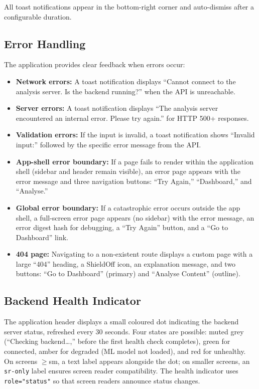 All toast notifications appear in the bottom-right corner and auto-dismiss after a configurable duration.

\subsection{Error Handling}

The application provides clear feedback when errors occur:
\begin{itemize}
\item \textbf{Network errors:} A toast notification displays ``Cannot connect to the analysis server. Is the backend running?'' when the API is unreachable.
\item \textbf{Server errors:} A toast notification displays ``The analysis server encountered an internal error. Please try again.'' for HTTP 500+ responses.
\item \textbf{Validation errors:} If the input is invalid, a toast notification shows ``Invalid input:'' followed by the specific error message from the API.
\item \textbf{App-shell error boundary:} If a page fails to render within the application shell (sidebar and header remain visible), an error page appears with the error message and three navigation buttons: ``Try Again,'' ``Dashboard,'' and ``Analyse.''
\item \textbf{Global error boundary:} If a catastrophic error occurs outside the app shell, a full-screen error page appears (no sidebar) with the error message, an error digest hash for debugging, a ``Try Again'' button, and a ``Go to Dashboard'' link.
\item \textbf{404 page:} Navigating to a non-existent route displays a custom page with a large ``404'' heading, a ShieldOff icon, an explanation message, and two buttons: ``Go to Dashboard'' (primary) and ``Analyse Content'' (outline).
\end{itemize}

\subsection{Backend Health Indicator}

The application header displays a small coloured dot indicating the backend server status, refreshed every 30 seconds. Four states are possible: muted grey (``Checking backend\ldots,'' before the first health check completes), green for connected, amber for degraded (ML model not loaded), and red for unhealthy. On screens $\geq$sm, a text label appears alongside the dot; on smaller screens, an \texttt{sr-only} label ensures screen reader compatibility. The health indicator uses \texttt{role="status"} so that screen readers announce status changes.

